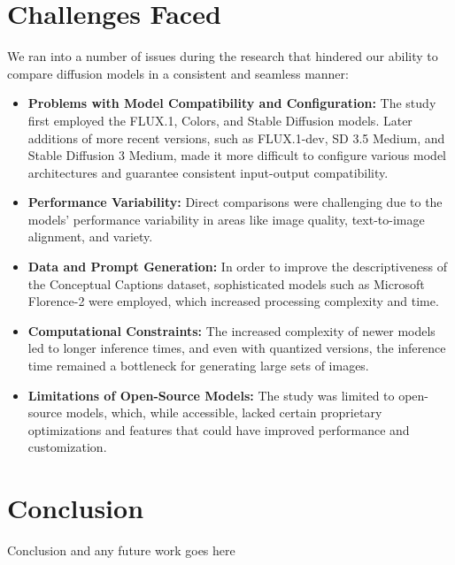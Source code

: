 \documentclass{article}
\begin{document}
\section{Challenges Faced}
We ran into a number of issues during the research that hindered our ability to compare diffusion models in a consistent and seamless manner:
\begin{itemize}
    \item \textbf{Problems with Model Compatibility and Configuration:} The study first employed the FLUX.1, Colors, and Stable Diffusion models. Later additions of more recent versions, such as FLUX.1-dev, SD 3.5 Medium, and Stable Diffusion 3 Medium, made it more difficult to configure various model architectures and guarantee consistent input-output compatibility.
    \item \textbf{Performance Variability:} Direct comparisons were challenging due to the models’ performance variability in areas like image quality, text-to-image alignment, and variety.
    \item \textbf{Data and Prompt Generation:} In order to improve the descriptiveness of the Conceptual Captions dataset, sophisticated models such as Microsoft Florence-2 were employed, which increased processing complexity and time.
    \item \textbf{Computational Constraints:} The increased complexity of newer models led to longer inference times, and even with quantized versions, the inference time remained a bottleneck for generating large sets of images.
    \item \textbf{Limitations of Open-Source Models:} The study was limited to open-source models, which, while accessible, lacked certain proprietary optimizations and features that could have improved performance and customization.
\end{itemize}

\section{Conclusion}
Conclusion and any future work goes here


\pagebreak

  
  
\end{document}
